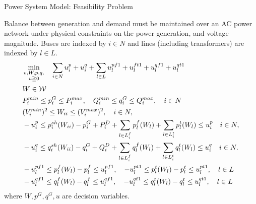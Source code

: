 \documentclass[xcolor=dvipsnames]{beamer}
\newcommand{\p}[1]{p^{#1}}
\newcommand{\q}[1]{q^{#1}}
\newcommand{\ii}{i}
\newcommand{\llll}{l}
\newcommand{\from}{f}
\newcommand{\tto}{t}
\newcommand{\WW}{W}
\newcommand{\WSet}{\mathcal{W}}
\newcommand{\Lines}{L}
\begin{document}
\begin{frame}{Power System Model: Feasibility Problem}
\begin{footnotesize}
Balance between generation and demand must be maintained over an AC power network under physical constraints on the power generation, and voltage magnitude.
Buses are indexed by $i \in N$ and lines (including transformers) are indexed by $l \in L$.
\begin{subequations}
\begin{align}
&\min_{\substack{v,W,p,q,\\ u \geqq 0}} \quad 
  \sum_{i \in N} u_i^p + u_i^q  + \sum_{l \in L} u_l^{pf1} + u_l^{ft1} + u_l^{qf1} + u_l^{qt1}  \notag \\
  & W \in \WSet \notag\\
  & P_i^{min} \leq p_i^G \leq P_i^{max}, \quad Q_i^{min} \leq q_i^G \leq Q_i^{max}, \quad i\in N \notag \\
  & (V_i^{min})^2 \leq W_{ii} \leq (V_i^{max})^2,\quad i\in N, \notag \\
  & -u_i^p \le p_i^{sh}(\WW_{ii}) - p^G_i + P^D_i 
	+ \sum_{\llll \in \Lines_\ii^{\from} } \p{\from}_{\llll}(\WW_\llll)  
	+\sum_{\llll \in \Lines_\ii^{\tto}   } \p{\tto}_{\llll}(\WW_\llll)
	\le u_i^p \quad i\in N, \notag\\ 
  & -u_i^q \le q_i^{sh}(\WW_{ii}) - q^G_i + Q^D_i 
	+ \sum_{\llll \in \Lines_\ii^{\from}} \q{\from}_{\llll}(\WW_\llll)
	+ \sum_{\llll \in \Lines_\ii^{\tto} } \q{\tto}_{\llll}(\WW_\llll)
	\le u_i^q \quad i\in N. \notag \\
& -u_l^{pf1} \le \p{\from}_{\llll}(\WW_\llll) - p_{l}^{f} \le u_l^{pf1}, \quad
 -u_l^{pt1} \le \p{\tto}_{\llll}(\WW_\llll)  - p_{l}^{t} \le u_l^{pt1}, \quad \llll \in L \notag \\
& -u_l^{qf1} \le \q{\from}_{\llll}(\WW_\llll) - q_{l}^{f} \le u_l^{qf1}, \quad 
 -u_l^{qt1} \le \q{\tto}_{\llll}(\WW_\llll)  - q_{l}^{t} \le u_l^{qt1}, \quad \llll \in L \notag
\end{align}
\end{subequations}
where $W,p^G,q^G,u$ are decision variables. 
\end{footnotesize}
\end{frame}
\end{document}
